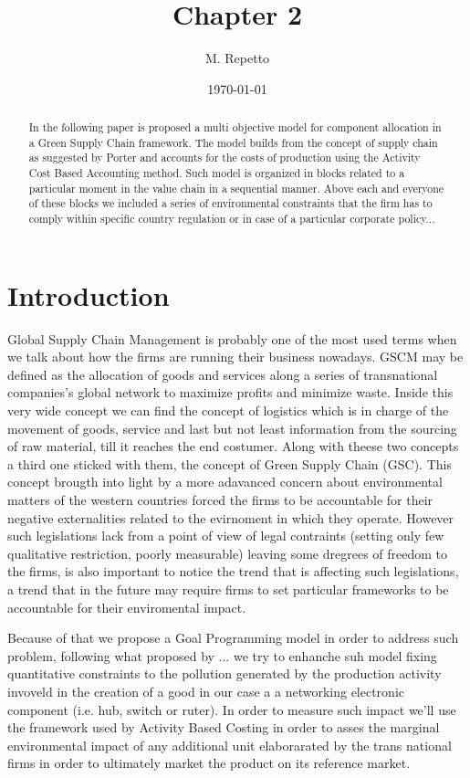 \documentclass{article}
\begin{document}
\title{Chapter 2}

\author{M. Repetto}

\date{\today}

\maketitle

\begin{abstract}
In the following paper is proposed a multi objective model for component allocation in a Green Supply Chain framework. The model builds from the concept of supply chain as suggested by Porter and accounts for the costs of production using the Activity Cost Based Accounting method. Such model is organized in blocks related to a particular moment in the value chain in a sequential manner. Above each and everyone of these blocks we included a series of environmental constraints that the firm has to comply within specific country regulation or in case of a particular corporate policy...
\end{abstract}

\section{Introduction}
Global Supply Chain Management is probably one of the most used terms when we talk about how the firms are running their business nowadays. GSCM may be defined as the allocation of goods and services along a series of transnational companies's global network to maximize profits and minimize waste. Inside this very wide concept we can find the concept of logistics which is in charge of the movement of goods, service and last but not least information from the sourcing of raw material, till it reaches the end costumer.
Along with theese two concepts a third one sticked with them, the concept of Green Supply Chain (GSC). This concept brougth into light by a more adavanced concern about environmental matters of the western countries forced the firms to be accountable for their negative externalities related to the evirnoment in which they operate. However such legislations lack from a point of view of legal contraints (setting only few qualitative restriction, poorly measurable) leaving some dregrees of freedom to the firms, is also important to notice the trend that is affecting such legislations, a trend that in the future may require firms to set particular frameworks to be accountable for their enviromental impact.

Because of that we propose a Goal Programming model in order to address such problem, following what proposed by ... we try to enhanche suh model fixing quantitative constraints to the pollution generated by the production activity invoveld in the creation of a good in our case a a networking electronic component (i.e. hub, switch or ruter). In order to measure such impact we'll use the framework used by Activity Based Costing in order to asses the marginal environmental impact of any additional unit elaborarated by the trans national firms in order to ultimately market the product on its reference market.
\end{document}

